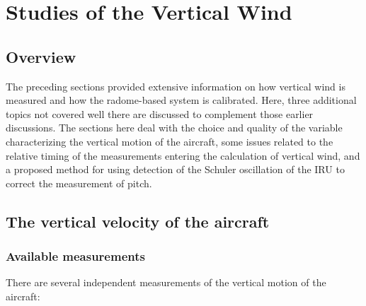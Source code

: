 \documentclass[12pt,twoside,english]{article}\usepackage[]{graphicx}\usepackage[]{color}
\let\stdsection\section
\renewcommand{\section}{\newpage\stdsection}
\let\OrgIndex\index
\renewcommand*{\index}[1]{\OrgIndex{#1}}
\begin{document}



\section{Studies of the Vertical Wind\label{sec:vertical-wind}}

\subsection{Overview}

The preceding sections provided extensive information on how vertical wind is measured and how the radome-based system is calibrated. Here, three additional topics not covered well there are discussed to complement those earlier discussions. The sections here deal with the choice and quality of the variable characterizing the vertical motion of the aircraft, some issues related to the relative timing of the measurements entering the calculation of vertical wind, and a proposed method for using detection of the Schuler oscillation of the IRU to correct the measurement of pitch. 


\subsection{The vertical velocity of the aircraft\label{sec:VerticalVelocity}}


\subsubsection{Available measurements}

There are several independent measurements of the vertical motion of the aircraft: 
\end{document}
